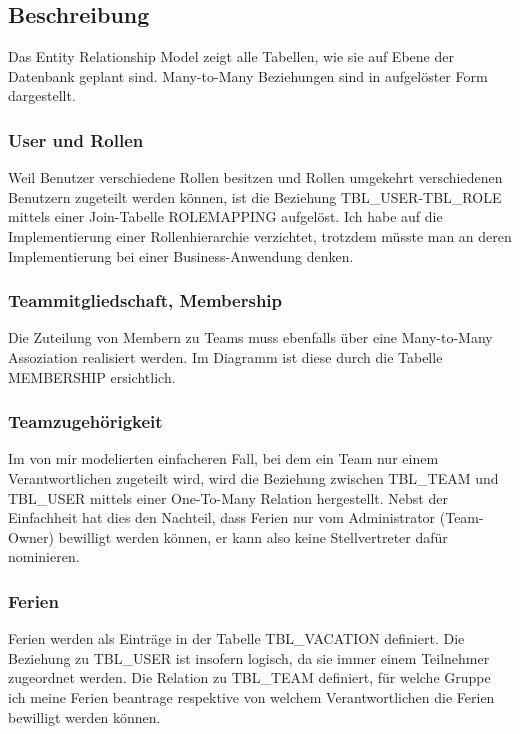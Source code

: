\subsection{Beschreibung}
Das Entity Relationship Model zeigt alle Tabellen, wie sie auf Ebene der Datenbank geplant sind. Many-to-Many Beziehungen sind in aufgel\"oster Form dargestellt.

\subsubsection{User und Rollen}
Weil Benutzer verschiedene Rollen besitzen und Rollen umgekehrt verschiedenen Benutzern zugeteilt werden k\"onnen, ist die Beziehung TBL\_USER-TBL\_ROLE mittels einer Join-Tabelle ROLEMAPPING aufgel\"ost. Ich habe auf die Implementierung einer Rollenhierarchie verzichtet, trotzdem m\"usste man an deren Implementierung bei einer Business-Anwendung denken. 

\subsubsection{Teammitgliedschaft, Membership}
Die Zuteilung von Membern zu Teams muss ebenfalls \"uber eine Many-to-Many Assoziation realisiert werden. Im Diagramm ist diese durch die Tabelle MEMBERSHIP ersichtlich. 

\subsubsection{Teamzugeh\"origkeit}
Im von mir modelierten einfacheren Fall, bei dem ein Team nur einem Verantwortlichen zugeteilt wird, wird die Beziehung zwischen TBL\_TEAM und TBL\_USER mittels einer One-To-Many Relation hergestellt. Nebst der Einfachheit hat dies den Nachteil, dass Ferien nur vom Administrator (Team-Owner) bewilligt werden k\"onnen, er kann also keine Stellvertreter daf\"ur nominieren. 

\subsubsection{Ferien}
Ferien werden als Eintr\"age in der Tabelle TBL\_VACATION definiert. Die Beziehung zu TBL\_USER ist insofern logisch, da sie immer einem Teilnehmer zugeordnet werden. Die Relation zu TBL\_TEAM definiert, f\"ur welche Gruppe ich meine Ferien beantrage respektive von welchem Verantwortlichen die Ferien bewilligt werden k\"onnen.
